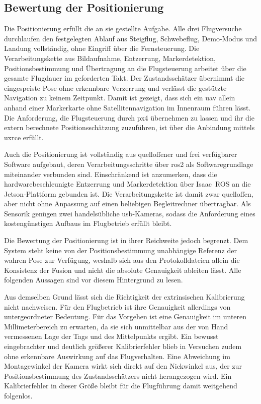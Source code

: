\subsection*{Bewertung der Positionierung}
\label{subsec:bewertung_positionierung}
Die Positionierung erfüllt die an sie gestellte Aufgabe.
Alle drei Flugversuche durchlaufen den festgelegten Ablauf aus Steigflug, Schwebeflug, Demo-Modus und Landung vollständig, ohne Eingriff über die Fernsteuerung.
Die Verarbeitungskette aus Bildaufnahme, Entzerrung, Markerdetektion, Positionsbestimmung und Übertragung an die Flugsteuerung arbeitet über die gesamte Flugdauer im geforderten Takt.
Der Zustandsschätzer übernimmt die eingespeiste Pose ohne erkennbare Verzerrung und verlässt die gestützte Navigation zu keinem Zeitpunkt.
Damit ist gezeigt, dass sich ein \gls{uav} allein anhand einer Markerkarte ohne Satellitennavigation im Innenraum führen lässt.
Die Anforderung, die Flugsteuerung durch \gls{px4} übernehmen zu lassen und ihr die extern berechnete Positionsschätzung zuzuführen, ist über die Anbindung mittels \gls{uxrce} erfüllt.

Auch die Positionierung ist vollständig aus quelloffener und frei verfügbarer Software aufgebaut, deren Verarbeitungsschritte über \gls{ros2} als Softwaregrundlage miteinander verbunden sind.
Einschränkend ist anzumerken, dass die hardwarebeschleunigte Entzerrung und Markerdetektion über Isaac~ROS an die Jetson-Plattform gebunden ist.
Die Verarbeitungskette ist damit zwar quelloffen, aber nicht ohne Anpassung auf einen beliebigen Begleitrechner übertragbar.
Als Sensorik genügen zwei handelsübliche \gls{usb}-Kameras, sodass die Anforderung eines kostengünstigen Aufbaus im Flugbetrieb erfüllt bleibt.

Die Bewertung der Positionierung ist in ihrer Reichweite jedoch begrenzt.
Dem System steht keine von der Positionsbestimmung unabhängige Referenz der wahren Pose zur Verfügung, weshalb sich aus den Protokolldateien allein die Konsistenz der Fusion und nicht die absolute Genauigkeit ableiten lässt.
Alle folgenden Aussagen sind vor diesem Hintergrund zu lesen.

Aus demselben Grund lässt sich die Richtigkeit der extrinsischen Kalibrierung nicht nachweisen.
Für den Flugbetrieb ist ihre Genauigkeit allerdings von untergeordneter Bedeutung.
Für das Vorgehen ist eine Genauigkeit im unteren Millimeterbereich zu erwarten, da sie sich unmittelbar aus der von Hand vermessenen Lage der Tags und des Mittelpunkts ergibt.
Ein bewusst eingebrachter und deutlich größerer Kalibrierfehler blieb in Versuchen zudem ohne erkennbare Auswirkung auf das Flugverhalten.
Eine Abweichung im Montagewinkel der Kamera wirkt sich direkt auf den Nickwinkel aus, der zur Positionsbestimmung des Zustandsschätzers nicht herangezogen wird.
Ein Kalibrierfehler in dieser Größe bleibt für die Flugführung damit weitgehend folgenlos.

